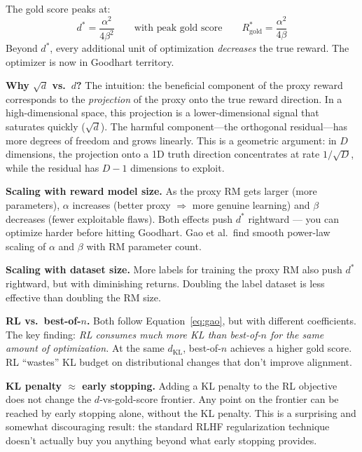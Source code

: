 \documentclass[11pt]{article}
\begin{document}
The gold score peaks at:
\begin{equation}
  d^* = \frac{\alpha^2}{4\beta^2}
  \qquad\text{with peak gold score}\qquad
  R^*_{\text{gold}} = \frac{\alpha^2}{4\beta}
\end{equation}
Beyond $d^*$, every additional unit of optimization \emph{decreases}
the true reward. The optimizer is now in Goodhart territory.

\textbf{Why $\sqrt{d}$ vs.\ $d$?} The intuition: the beneficial
component of the proxy reward corresponds to the \emph{projection} of
the proxy onto the true reward direction. In a high-dimensional space,
this projection is a lower-dimensional signal that saturates quickly
($\sqrt{d}$). The harmful component---the orthogonal residual---has
more degrees of freedom and grows linearly. This is a geometric
argument: in $D$ dimensions, the projection onto a 1D truth direction
concentrates at rate $1/\sqrt{D}$, while the residual has $D-1$
dimensions to exploit.

\textbf{Scaling with reward model size.} As the proxy RM gets larger
(more parameters), $\alpha$ increases (better proxy $\Rightarrow$ more
genuine learning) and $\beta$ decreases (fewer exploitable flaws).
Both effects push $d^*$ rightward --- you can optimize harder before
hitting Goodhart. Gao et al.\ find smooth power-law scaling of
$\alpha$ and $\beta$ with RM parameter count.

\textbf{Scaling with dataset size.} More labels for training the proxy
RM also push $d^*$ rightward, but with diminishing returns. Doubling
the label dataset is less effective than doubling the RM size.

\textbf{RL vs.\ best-of-$n$.} Both follow Equation~\ref{eq:gao}, but
with different coefficients. The key finding: \emph{RL consumes much
more KL than best-of-$n$ for the same amount of optimization.} At the
same $d_{\text{KL}}$, best-of-$n$ achieves a higher gold score. RL
``wastes'' KL budget on distributional changes that don't improve
alignment.

\textbf{KL penalty $\approx$ early stopping.} Adding a KL penalty to
the RL objective does not change the $d$-vs-gold-score frontier. Any
point on the frontier can be reached by early stopping alone, without
the KL penalty. This is a surprising and somewhat discouraging result:
the standard RLHF regularization technique doesn't actually buy you
anything beyond what early stopping provides.
\end{document}
